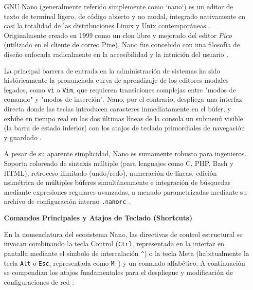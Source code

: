 \documentclass[a4paper,12pt]{article}
\begin{document}
GNU Nano (generalmente referido simplemente como `nano`) es un editor de texto de terminal ligero, de código abierto y no modal, integrado nativamente en casi la totalidad de las distribuciones Linux y Unix contemporáneas \cite{nano_editor_official, arsys_nano}. Originalmente creado en 1999 como un clon libre y mejorado del editor \textit{Pico} (utilizado en el cliente de correo Pine), Nano fue concebido con una filosofía de diseño enfocada radicalmente en la accesibilidad y la intuición del usuario \cite{ubuntu_community_nano}. 

La principal barrera de entrada en la administración de sistemas ha sido históricamente la pronunciada curva de aprendizaje de los editores modales legados, como \texttt{vi} o \texttt{Vim}, que requieren transiciones complejas entre "modos de comando" y "modos de inserción". Nano, por el contrario, despliega una interfaz directa donde las teclas introducen caracteres inmediatamente en el búfer, y exhibe en tiempo real en las dos últimas líneas de la consola un submenú visible (la barra de estado inferior) con los atajos de teclado primordiales de navegación y guardado \cite{librebyte_nano, arsys_nano}. 

A pesar de su aparente simplicidad, Nano es sumamente robusto para ingenieros. Soporta coloreado de sintaxis múltiple (para lenguajes como C, PHP, Bash y HTML), retroceso ilimitado (undo/redo), numeración de líneas, edición asimétrica de múltiples búferes simultáneamente e integración de búsquedas mediante expresiones regulares avanzadas, a menudo parametrizadas mediante su archivo de configuración interno \texttt{.nanorc} \cite{librebyte_nano, nano_editor_official}.

\textbf{Comandos Principales y Atajos de Teclado (Shortcuts)}

En la nomenclatura del ecosistema Nano, las directivas de control estructural se invocan combinando la tecla Control (\texttt{Ctrl}, representada en la interfaz en pantalla mediante el símbolo de intercalación \texttt{\^}) o la tecla Meta (habitualmente la tecla \texttt{Alt} o \texttt{Esc}, representada como \texttt{M-}) y un comando alfabético. A continuación se compendian los atajos fundamentales para el despliegue y modificación de configuraciones de red \cite{librebyte_nano, nano_editor_official, arsys_nano}:
\end{document}
